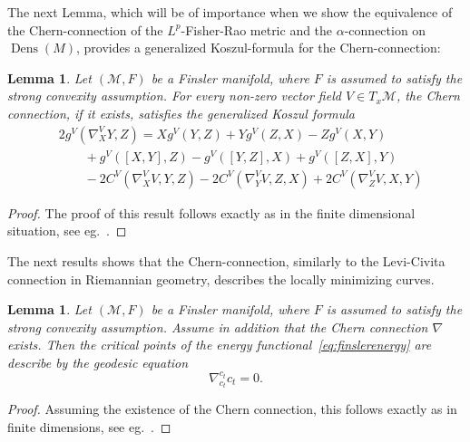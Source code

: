 \documentclass[11pt]{amsart}
\newtheorem{lemma}[theorem]{Lemma}
\theoremstyle{definition}
\begin{document}
The next Lemma, which will be of importance when we show the equivalence of the Chern-connection of the $L^p$-Fisher-Rao metric and the $\alpha$-connection on $\operatorname{Dens}(M)$, provides a generalized Koszul-formula for the Chern-connection:
\begin{lemma}\label{lem:koszul}
Let $(\mathcal M, F)$ be a Finsler manifold, where $F$ is assumed to satisfy the strong convexity assumption. For every non-zero vector field $V\in T_x\mathcal M$, the Chern connection, if it exists, satisfies the  generalized Koszul formula
\begin{equation}\label{koszul}
\begin{aligned}
&2g^V(\nabla^V_X Y,Z)=X g^V(Y,Z)+ Y g^V(Z,X)-Z g^V(X,Y)\\
&\qquad + g^V([X,Y],Z)-g^V([Y,Z],X)+g^V([Z,X],Y)\\
&\qquad -2C^V(\nabla^V_X V,Y,Z)-2C^V(\nabla^V_Y V,Z,X)+2C^V(\nabla^V_Z V,X,Y) 
\end{aligned}
\end{equation}
\end{lemma}
\begin{proof}
    The proof of this result follows exactly as in the finite dimensional situation, see eg.~\cite{chern2005riemann}.
\end{proof}
The next results shows that the Chern-connection, similarly to the Levi-Civita connection in Riemannian geometry, describes the locally minimizing curves. 
\begin{lemma}\label{lem:finsler-chern}
Let $(\mathcal M, F)$ be a Finsler manifold, where $F$ is assumed to satisfy the strong convexity assumption. Assume in addition that the Chern connection $\nabla$ exists. 
Then the critical points of the energy functional~\eqref{eq:finslerenergy} are describe by the geodesic equation
\begin{equation}
\nabla^{{c_t}}_{c_t}c_t=0.
\end{equation}
\end{lemma}
\begin{proof}
Assuming the existence of the Chern connection, this follows exactly as  in finite dimensions, see eg.~\cite{chern2005riemann,rademacher2004nonreversible}.    
\end{proof}







\end{document}
